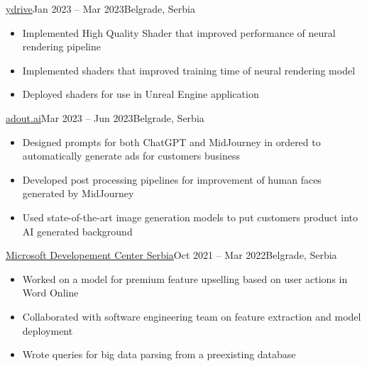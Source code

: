 \documentclass[10pt,a4paper]{source/altacv}
\begin{document}
\divider

 {\href{https://ydrive.ai/}{ydrive}}{Jan 2023 -- Mar 2023}{Belgrade, Serbia}
\begin{itemize}
    \item   \small{Implemented High Quality Shader that improved performance of neural rendering pipeline}
    \item   \small{Implemented shaders that improved training time of neural rendering model}
    \item   \small{Deployed shaders for use in Unreal Engine application}
    \\
    \smallskip
    \smallskip
      

\end{itemize}

\divider

 {\href{https://www.adout.ai/}{adout.ai}}{Mar 2023 -- Jun 2023}{Belgrade, Serbia}
\begin{itemize}
    \item   \small{Designed prompts for both ChatGPT and MidJourney in ordered to automatically generate ads for customers business}
    \item   \small{Developed post processing pipelines for improvement of human faces generated by MidJourney}
    \item \small{Used state-of-the-art image generation models to put customers product into AI generated background}
    \\
    \smallskip
    \smallskip
      

\end{itemize}

\divider



 {\href{https://www.microsoft.com/en-rs/mdcs}{Microsoft Developement Center Serbia}}{Oct 2021 -- Mar 2022}{Belgrade, Serbia}

\begin{itemize}
    \item   \small{Worked on a model for premium feature upselling based on user actions in Word Online}
    \item   \small{Collaborated with software engineering team on feature extraction and model deployment}
    \item \small{Wrote queries for big data parsing from a preexisting database}
    \\
    \smallskip
    \smallskip
      

\end{itemize}
\end{document}
